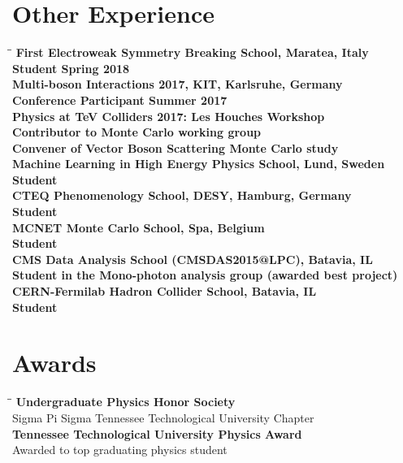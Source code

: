 \documentclass[10pt]{res} %
\begin{document}
\begin{resume}
\section{Other Experience}
\vspace{-0.1in}
\begin{tabbing}
\hspace{2.3in}\= \hspace{2.6in}\= \kill %
\bf{First Electroweak Symmetry Breaking School, Maratea, Italy}		\\
  Student \>\> Spring 2018 \\
\bf{Multi-boson Interactions 2017, KIT, Karlsruhe, Germany}		\\
  Conference Participant \>\> Summer 2017 \\
\bf{Physics at TeV Colliders 2017: Les Houches Workshop}		\\
  Contributor to Monte Carlo working group \>\\
  Convener of Vector Boson Scattering Monte Carlo study \\
\bf{Machine Learning in High Energy Physics School, Lund, Sweden}		\\
  Student \>\\
\bf{CTEQ Phenomenology School, DESY, Hamburg, Germany}		\\
  Student \>\\
\bf{MCNET Monte Carlo School, Spa, Belgium}		\\
  Student \>\\
\bf{CMS Data Analysis School (CMSDAS2015@LPC), Batavia, IL}		\\
  Student in the Mono-photon analysis group (awarded best project) \>\\
\bf{CERN-Fermilab Hadron Collider School, Batavia, IL}		\\
  Student \>\\
\end{tabbing}
	

\section{Awards}
\vspace{-0.1in}
\begin{tabbing}
\hspace{2.3in}\= \hspace{2.6in}\= \kill %
\textbf{Undergraduate Physics Honor Society} \>\\
Sigma Pi Sigma Tennessee Technological University Chapter 	    \\
\textbf{Tennessee Technological University Physics Award} 				\>\>{Spring 2013 }\\
Awarded to top graduating physics student \\
\end{tabbing}


\end{resume}
\end{document}
